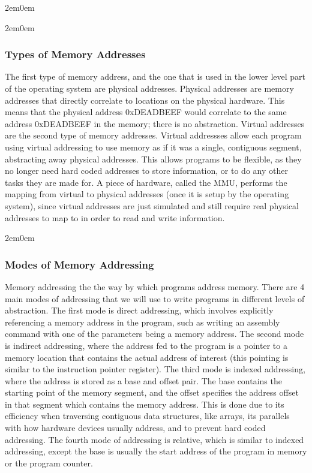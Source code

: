 \documentclass[openany, 12px]{book}
\begin{document}
\begin{adjustwidth}{2em}{0em}
\begin{adjustwidth}{2em}{0em}
\subsubsection{Types of Memory Addresses}
The first type of memory address, and the one that is used in the lower level part of the operating system are physical addresses. Physical addresses are memory addresses that directly correlate to locations on the physical hardware. This means that the physical address 0xDEADBEEF would correlate to the same address 0xDEADBEEF in the memory; there is no abstraction. Virtual addresses are the second type of memory addresses. Virtual addressses allow each program using virtual addressing to use memory as if it was a single, contiguous segment, abstracting away physical addresses. This allows programs to be flexible, as they no longer need hard coded addresses to store information, or to do any other tasks they are made for. A piece of hardware, called the MMU, performs the mapping from virtual to physical addresses (once it is setup by the operating system), since virtual addresses are just simulated and still require real physical addresses to map to in order to read and write information.
\end{adjustwidth}
\begin{adjustwidth}{2em}{0em}
\subsubsection{Modes of Memory Addressing}
Memory addressing the the way by which programs address memory. There are 4 main modes of addressing that we will use to write programs in different levels of abstraction. The first mode is direct addressing, which involves explicitly referencing a memory address in the program, such as writing an assembly command with one of the parameters being a memory address. The second mode is indirect addressing, where the address fed to the program is a pointer to a memory location that contains the actual address of interest (this pointing is similar to the instruction pointer register). The third mode is indexed addressing, where the address is stored as a base and offset pair. The base contains the starting point of the memory segment, and the offset specifies the address offset in that segment which contains the memory address. This is done due to its efficiency when traversing contiguous data structures, like arrays, its parallels with how hardware devices usually address, and to prevent hard coded addressing. The fourth mode of addressing is relative, which is similar to indexed addressing, except the base is usually the start address of the program in memory or the program counter.
\end{adjustwidth}
\end{adjustwidth}
\end{document}
